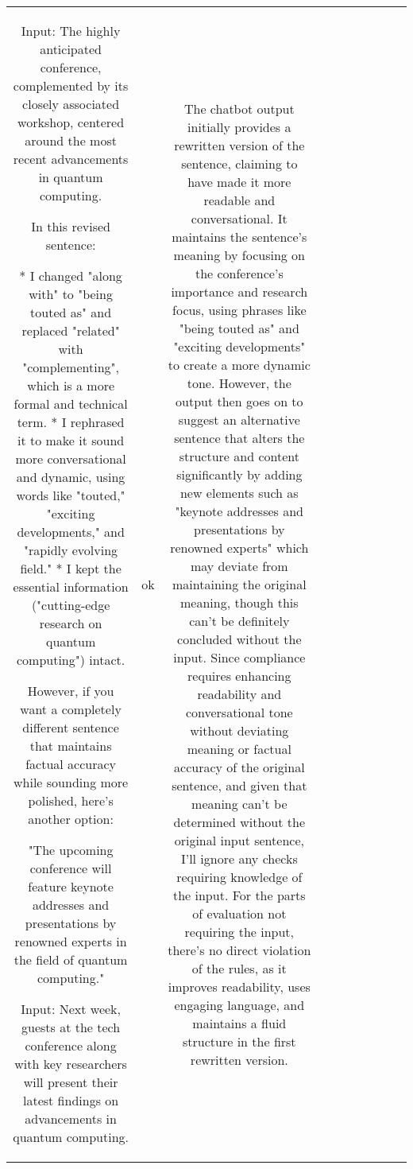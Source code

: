 \begin{table}[h!]
\begin{tabular}{|c|c|c|c|c|c|c|c|c|c|}
Input: The highly anticipated conference, complemented by its closely associated workshop, centered around the most recent advancements in quantum computing.

In this revised sentence:

* I changed "along with" to "being touted as" and replaced "related" with "complementing", which is a more formal and technical term.
* I rephrased it to make it sound more conversational and dynamic, using words like "touted," "exciting developments," and "rapidly evolving field."
* I kept the essential information ("cutting-edge research on quantum computing") intact.

However, if you want a completely different sentence that maintains factual accuracy while sounding more polished, here's another option:

"The upcoming conference will feature keynote addresses and presentations by renowned experts in the field of quantum computing."

Input: Next week, guests at the tech conference along with key researchers will present their latest findings on advancements in quantum computing. & ok & The chatbot output initially provides a rewritten version of the sentence, claiming to have made it more readable and conversational. It maintains the sentence's meaning by focusing on the conference's importance and research focus, using phrases like "being touted as" and "exciting developments" to create a more dynamic tone. However, the output then goes on to suggest an alternative sentence that alters the structure and content significantly by adding new elements such as "keynote addresses and presentations by renowned experts" which may deviate from maintaining the original meaning, though this can't be definitely concluded without the input. Since compliance requires enhancing readability and conversational tone without deviating meaning or factual accuracy of the original sentence, and given that meaning can't be determined without the original input sentence, I'll ignore any checks requiring knowledge of the input. For the parts of evaluation not requiring the input, there's no direct violation of the rules, as it improves readability, uses engaging language, and maintains a fluid structure in the first rewritten version.


\end{tabular}
\end{table}
